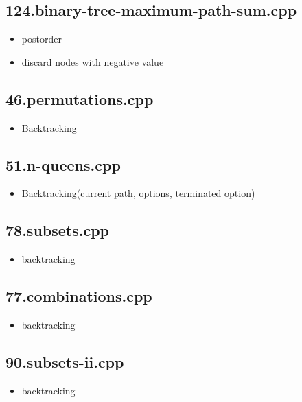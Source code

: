 \subsection{124.binary-tree-maximum-path-sum.cpp}

\begin{itemize}
	\item postorder
	\item discard nodes with negative value
\end{itemize}

\subsection{46.permutations.cpp}

\begin{itemize}
	\item Backtracking
\end{itemize}

\subsection{51.n-queens.cpp}

\begin{itemize}
	\item Backtracking(current path, options, terminated option)
\end{itemize}

\subsection{78.subsets.cpp}

\begin{itemize}
	\item backtracking
\end{itemize}

\subsection{77.combinations.cpp}

\begin{itemize}
	\item backtracking
\end{itemize}

\subsection{90.subsets-ii.cpp}

\begin{itemize}
	\item backtracking
\end{itemize}

